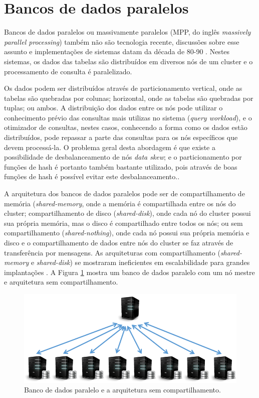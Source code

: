 \section{Bancos de dados paralelos}

Bancos de dados paralelos ou massivamente paralelos (MPP, do inglês 
\emph{massively parallel processing}) também não são tecnologia 
recente, discussões sobre esse assunto e implementações de sistemas
datam da década de 80-90 \cite{Dewitt1992, Fushimi1986}. Nestes 
sistemas, os dados das tabelas são distribuídos em diversos 
nós de um cluster e o processamento de consulta é paralelizado.

Os dados podem ser distribuídos através de particionamento vertical,
onde as tabelas são quebradas por colunas; horizontal, onde as 
tabelas são quebradas por tuplas; ou ambos. A distribuição dos 
dados entre os nós pode utilizar o conhecimento prévio
das consultas mais utilizas no sistema (\emph{query workload}),
e o otimizador de consultas, nestes casos, conhecendo a forma
como os dados estão distribuídos, pode repassar a parte das
consultas para os nós específicos que devem processá-la. O problema
geral desta abordagem é que existe a possibilidade de desbalanceamento
de nós \emph{data skew}; e o particionamento por funções de hash é portanto também
bastante utilizado, pois através de boas funções de hash é possível
evitar este desbalanceamento..

A arquitetura dos bancos de dados paralelos pode ser de compartilhamento 
de memória (\emph{shared-memory}, onde a memória é compartilhada entre os
nós do cluster; compartilhamento de disco (\emph{shared-disk}), onde
cada nó do cluster possui sua própria memória, mas o disco é compartilhado
entre todos os nós; ou sem compartilhamento (\emph{shared-nothing}), onde
cada nó possui sua própria memória e disco e o compartilhamento de dados
entre nós do cluster se faz através de transferência por mensagens. As 
arquiteturas com compartilhamento (\emph{shared-memory} e \emph{shared-disk})
se mostraram ineficientes em escalabilidade para grandes implantações
\cite{Dewitt1992, Stonebraker1986}. A Figura \ref{fig:mpp_arq} mostra
um banco de dados paralelo com um nó mestre e arquitetura sem 
compartilhamento.


\begin{figure}
        \centering
        \includegraphics[width=\linewidth]{./mpp_database.png}
        \caption{Banco de dados paralelo e a arquitetura sem compartilhamento.}
        \label{fig:mpp_arq}
\end{figure}


